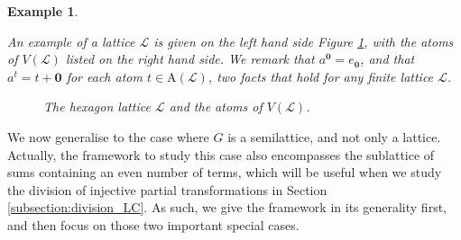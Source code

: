 \documentclass[a4paper, 11pt]{article}
\theoremstyle{plain}
\newtheorem{example}    [theorem]{Example}
\theoremstyle{definition}
\newcommand{\zero}      {\mathbf{0}}
\newcommand{\one}       {\mathbf{1}}
\newcommand{\Atoms}     {\mathrm{A}}
\begin{document}
\begin{example} \label{example:hexagon}

An example of a lattice $\mathcal{L}$ is given on the left hand side Figure \ref{figure:hexagon}, with the atoms of $V( \mathcal{L} )$ listed on the right hand side. We remark that $a^\zero = e_\zero$, and that $a^t = t + \zero$ for each atom $t \in \Atoms( \mathcal{L} )$, two facts that hold for any finite lattice $\mathcal{L}$.

\begin{figure}[!hb]
    \centering

    
    \caption{The hexagon lattice $\mathcal{L}$ and the atoms of $V( \mathcal{L} )$.}
    \label{figure:hexagon}
\end{figure}
\end{example}


We now generalise to the case where $G$ is a semilattice, and not only a lattice. Actually, the framework to study this case also encompasses the sublattice of sums containing an even number of terms, which will be useful when we study the division of injective partial transformations in Section \ref{subsection:division_LC}. As such, we give the framework in its generality first, and then focus on those two important special cases.
\end{document}
